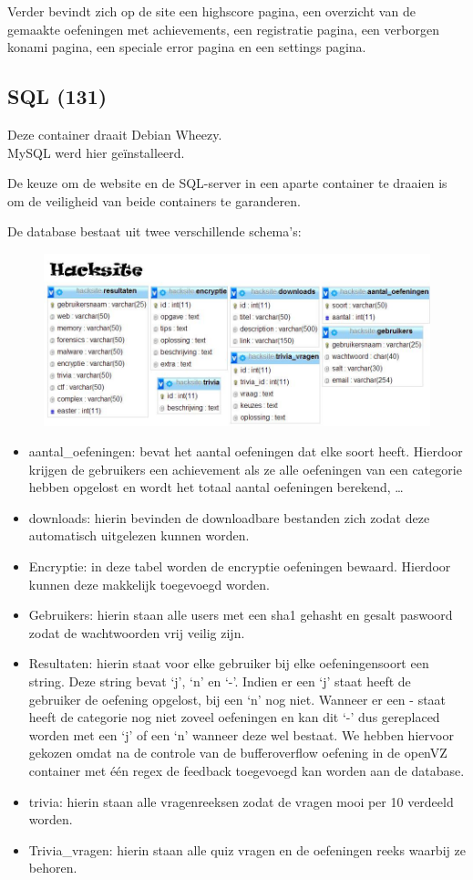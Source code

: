 Verder bevindt zich op de site een highscore pagina, een overzicht van de gemaakte oefeningen met achievements, een registratie pagina, een verborgen konami pagina, een speciale error pagina en een settings pagina.
\subsection{SQL (131)}
Deze container draait Debian Wheezy.\\
MySQL werd hier ge\"installeerd.

De keuze om de website en de SQL-server in een aparte container te draaien is om de veiligheid van beide containers te garanderen.

De database bestaat uit twee verschillende schema’s:
\begin{figure}[H]
\centering
\includegraphics[scale=0.5]{systeem/db1.jpg}
\end{figure}
	\begin{itemize}
	\item aantal\_oefeningen: bevat het aantal oefeningen dat elke soort heeft. Hierdoor krijgen de gebruikers een achievement als ze alle oefeningen van een categorie hebben opgelost en wordt het totaal aantal oefeningen berekend, \ldots
	\item downloads: hierin bevinden de downloadbare bestanden zich zodat deze automatisch uitgelezen kunnen worden.
	\item Encryptie: in deze tabel worden de encryptie oefeningen bewaard. Hierdoor kunnen deze makkelijk toegevoegd worden.
	\item Gebruikers: hierin staan alle users met een sha1 gehasht en gesalt paswoord zodat de wachtwoorden vrij veilig zijn.
	\item Resultaten: hierin staat voor elke gebruiker bij elke oefeningensoort een string. Deze string bevat `j', `n' en `-'. Indien er een `j' staat heeft de gebruiker de oefening opgelost, bij een `n’ nog niet. Wanneer er een - staat heeft de categorie nog niet zoveel oefeningen en kan dit `-' dus gereplaced worden met een `j' of een `n' wanneer deze wel bestaat. We hebben hiervoor gekozen omdat na de controle van de bufferoverflow oefening in de openVZ container met \'e\'en regex de feedback toegevoegd kan worden aan de database.
	\item trivia: hierin staan alle vragenreeksen zodat de vragen mooi per 10 verdeeld worden.
	\item Trivia\_vragen: hierin staan alle quiz vragen en de oefeningen reeks waarbij ze behoren.
	\end{itemize}
